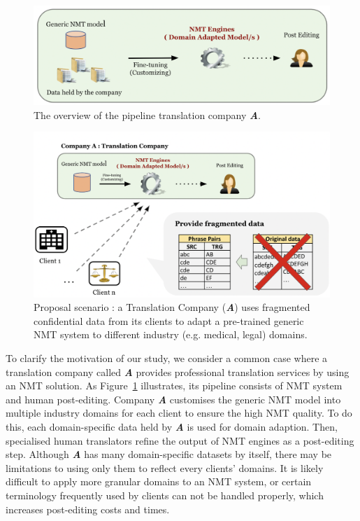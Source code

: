 \begin{figure}[!htb]
    \centering
    \hspace{-3mm}
    \includegraphics[scale=0.28]{images/companyA.png}
    \caption{ The overview of the pipeline translation company \textit{\textbf{A}}.}
    \label{fig:companyA}
\end{figure}
\begin{figure}[!htb]
    \centering
    \includegraphics[scale=0.57]{images/motivated_scenario.png}
    \caption{ Proposal scenario : a Translation Company (\textit{\textbf{A}}) uses fragmented confidential data from its clients to adapt a pre-trained generic NMT system to different industry (e.g. medical, legal) domains. }
    \label{fig:scenario}
\end{figure}

To clarify the motivation of our study, we consider a common case where a translation company called \textit{\textbf{A}} provides professional translation services by using an NMT solution. As Figure~\ref{fig:companyA} illustrates, its pipeline consists of NMT system and human post-editing. Company \textit{\textbf{A}} customises the generic NMT model into multiple industry domains for each client to ensure the high NMT quality. To do this, each domain-specific data held by \textit{\textbf{A}} is used for domain adaption. Then, specialised human translators refine the output of NMT engines as a post-editing step. Although \textit{\textbf{A}} has many domain-specific datasets by itself, there may be limitations to using only them to reflect every clients' domains. It is likely difficult to apply more granular domains to an NMT system, or certain terminology frequently used by clients can not be handled properly, which increases post-editing costs and times. 

